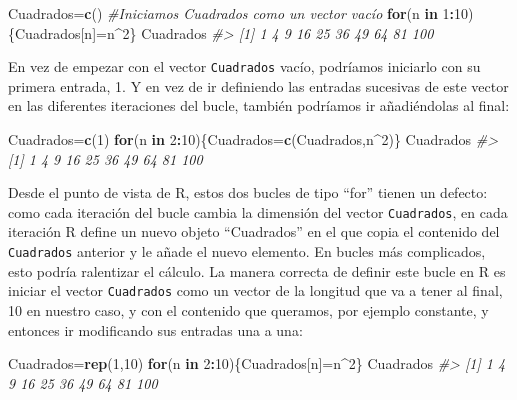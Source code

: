 \documentclass[
]{book}
\newenvironment{Shaded}{\begin{snugshade}}{\end{snugshade}}
\newcommand{\CommentTok}[1]{\textcolor[rgb]{0.56,0.35,0.01}{\textit{#1}}}
\newcommand{\ControlFlowTok}[1]{\textcolor[rgb]{0.13,0.29,0.53}{\textbf{#1}}}
\newcommand{\DecValTok}[1]{\textcolor[rgb]{0.00,0.00,0.81}{#1}}
\newcommand{\KeywordTok}[1]{\textcolor[rgb]{0.13,0.29,0.53}{\textbf{#1}}}
\newcommand{\NormalTok}[1]{#1}
\newcommand{\OperatorTok}[1]{\textcolor[rgb]{0.81,0.36,0.00}{\textbf{#1}}}
\theoremstyle{definition}
\theoremstyle{definition}
\theoremstyle{definition}
\theoremstyle{remark}
\begin{document}
\begin{Shaded}
\begin{Highlighting}[]
\NormalTok{Cuadrados=}\KeywordTok{c}\NormalTok{()  }\CommentTok{\#Iniciamos Cuadrados como un vector vacío}
\ControlFlowTok{for}\NormalTok{(n }\ControlFlowTok{in} \DecValTok{1}\OperatorTok{:}\DecValTok{10}\NormalTok{)\{Cuadrados[n]=n}\OperatorTok{\^{}}\DecValTok{2}\NormalTok{\}}
\NormalTok{Cuadrados}
\CommentTok{\#\textgreater{}  [1]   1   4   9  16  25  36  49  64  81 100}
\end{Highlighting}
\end{Shaded}

En vez de empezar con el vector \texttt{Cuadrados} vacío, podríamos iniciarlo con su primera entrada, 1. Y en vez de ir definiendo las entradas sucesivas de este vector en las diferentes iteraciones del bucle, también podríamos ir añadiéndolas al final:

\begin{Shaded}
\begin{Highlighting}[]
\NormalTok{Cuadrados=}\KeywordTok{c}\NormalTok{(}\DecValTok{1}\NormalTok{)  }
\ControlFlowTok{for}\NormalTok{(n }\ControlFlowTok{in} \DecValTok{2}\OperatorTok{:}\DecValTok{10}\NormalTok{)\{Cuadrados=}\KeywordTok{c}\NormalTok{(Cuadrados,n}\OperatorTok{\^{}}\DecValTok{2}\NormalTok{)\}}
\NormalTok{Cuadrados}
\CommentTok{\#\textgreater{}  [1]   1   4   9  16  25  36  49  64  81 100}
\end{Highlighting}
\end{Shaded}

Desde el punto de vista de R, estos dos bucles de tipo ``for'' tienen un defecto: como cada iteración del bucle cambia la dimensión del vector \texttt{Cuadrados}, en cada iteración R define un nuevo objeto ``Cuadrados'' en el que copia el contenido del \texttt{Cuadrados} anterior y le añade el nuevo elemento. En bucles más complicados, esto podría ralentizar el cálculo. La manera correcta de definir este bucle en R es iniciar el vector \texttt{Cuadrados} como un vector de la longitud que va a tener al final, 10 en nuestro caso, y con el contenido que queramos, por ejemplo constante, y entonces ir modificando sus entradas una a una:

\begin{Shaded}
\begin{Highlighting}[]
\NormalTok{Cuadrados=}\KeywordTok{rep}\NormalTok{(}\DecValTok{1}\NormalTok{,}\DecValTok{10}\NormalTok{)  }
\ControlFlowTok{for}\NormalTok{(n }\ControlFlowTok{in} \DecValTok{2}\OperatorTok{:}\DecValTok{10}\NormalTok{)\{Cuadrados[n]=n}\OperatorTok{\^{}}\DecValTok{2}\NormalTok{\}}
\NormalTok{Cuadrados}
\CommentTok{\#\textgreater{}  [1]   1   4   9  16  25  36  49  64  81 100}
\end{Highlighting}
\end{Shaded}
\end{document}
